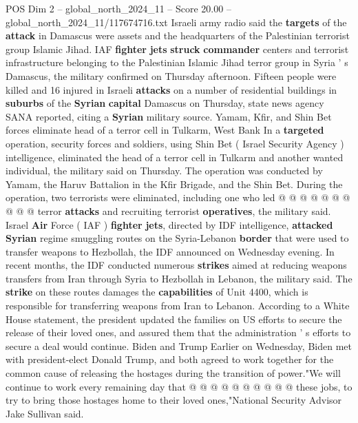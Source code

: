 \begin{textsample}{POS Dim 2 – global\_north\_2024\_11 – Score 20.00 – global\_north\_2024\_11/117674716.txt}  \label{ex:f2_pos_259}
Israeli army radio said the \textbf{targets} of the \textbf{attack} in Damascus were assets and the headquarters of the Palestinian terrorist group Islamic Jihad.
IAF \textbf{fighter} \textbf{jets} \textbf{struck} \textbf{commander} centers and terrorist infrastructure belonging to the Palestinian Islamic Jihad terror group in Syria ' s Damascus, the military confirmed on Thursday afternoon.
Fifteen people were killed and 16 injured in Israeli \textbf{attacks} on a number of residential buildings in \textbf{suburbs} of the \textbf{Syrian} \textbf{capital} Damascus on Thursday, state news agency SANA reported, citing a \textbf{Syrian} military source.
Yamam, Kfir, and Shin Bet forces eliminate head of a terror cell in Tulkarm, West Bank In a \textbf{targeted} operation, security forces and soldiers, using Shin Bet ( Israel Security Agency ) intelligence, eliminated the head of a terror cell in Tulkarm and another wanted individual, the military said on Thursday.
The operation was conducted by Yamam, the Haruv Battalion in the Kfir Brigade, and the Shin Bet.
During the operation, two terrorists were eliminated, including one who led @ @ @ @ @ @ @ @ @ @ terror \textbf{attacks} and recruiting terrorist \textbf{operatives}, the military said.
Israel \textbf{Air} Force ( IAF ) \textbf{fighter} \textbf{jets}, directed by IDF intelligence, \textbf{attacked} \textbf{Syrian} regime smuggling routes on the Syria-Lebanon \textbf{border} that were used to transfer weapons to Hezbollah, the IDF announced on Wednesday evening.
In recent months, the IDF conducted numerous \textbf{strikes} aimed at reducing weapons transfers from Iran through Syria to Hezbollah in Lebanon, the military said.
The \textbf{strike} on these routes damages the \textbf{capabilities} of Unit 4400, which is responsible for transferring weapons from Iran to Lebanon.
According to a White House statement, the president updated the families on US efforts to secure the release of their loved ones, and assured them that the administration ' s efforts to secure a deal would continue.
Biden and Trump Earlier on Wednesday, Biden met with president-elect Donald Trump, and both agreed to work together for the common cause of releasing the hostages during the transition of power."We will continue to work every remaining day that @ @ @ @ @ @ @ @ @ @ these jobs, to try to bring those hostages home to their loved ones,"National Security Advisor Jake Sullivan said.

\end{textsample}
